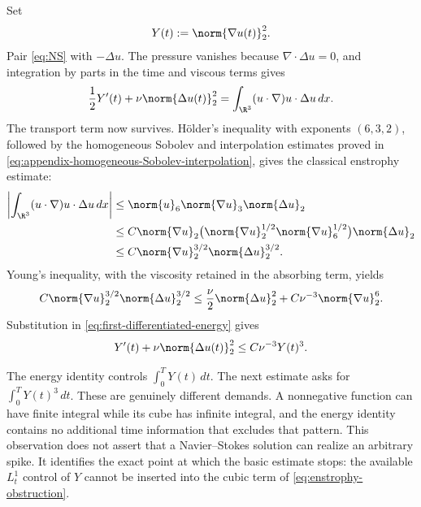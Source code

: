 Set
\[
 Y(t):=\norm{\nabla u(t)}_2^2.
\]
Pair \eqref{eq:NS} with \(-\Delta u\).  The pressure vanishes because
\(\nabla\cdot\Delta u=0\), and integration by parts in the time and viscous
terms gives
\begin{equation}
 \frac12Y'(t)+\nu\norm{\Delta u(t)}_2^2
 =\int_{\R^3}(u\cdot\nabla)u\cdot\Delta u\,dx.
 \label{eq:first-differentiated-energy}
\end{equation}
The transport term now survives.  Hölder's inequality with exponents
\((6,3,2)\), followed by the homogeneous Sobolev and interpolation estimates
proved in \eqref{eq:appendix-homogeneous-Sobolev-interpolation}, gives the
classical enstrophy estimate:
\begin{align*}
 \left|\int_{\R^3}(u\cdot\nabla)u\cdot\Delta u\,dx\right|
 &\le \norm{u}_6\norm{\nabla u}_3\norm{\Delta u}_2\\
 &\le C\norm{\nabla u}_2
          \bigl(\norm{\nabla u}_2^{1/2}
                \norm{\nabla u}_6^{1/2}\bigr)
          \norm{\Delta u}_2\\
 &\le C\norm{\nabla u}_2^{3/2}
          \norm{\Delta u}_2^{3/2}.
\end{align*}
Young's inequality, with the viscosity retained in the absorbing term, yields
\[
 C\norm{\nabla u}_2^{3/2}\norm{\Delta u}_2^{3/2}
 \le \frac{\nu}{2}\norm{\Delta u}_2^2
      +C\nu^{-3}\norm{\nabla u}_2^6.
\]
Substitution in \eqref{eq:first-differentiated-energy} gives
\begin{equation}
 Y'(t)+\nu\norm{\Delta u(t)}_2^2
 \le C\nu^{-3}Y(t)^3.
 \label{eq:enstrophy-obstruction}
\end{equation}

The energy identity controls \(\int_0^T Y(t)\,dt\).  The next estimate asks
for \(\int_0^T Y(t)^3\,dt\).  These are genuinely different demands.  A
nonnegative function can have finite integral while its cube has infinite
integral, and the energy identity contains no additional time information
that excludes that pattern.  This observation does not assert that a
Navier--Stokes solution can realize an arbitrary spike.  It identifies the
exact point at which the basic estimate stops: the available \(L^1_t\) control
of \(Y\) cannot be inserted into the cubic term of
\eqref{eq:enstrophy-obstruction}.

